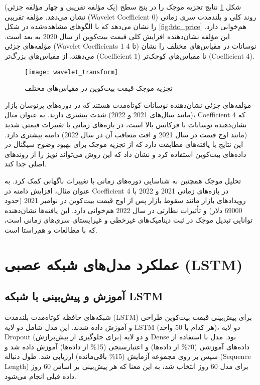 شکل \ref{fig:wavelet_transform} نتایج تجزیه موجک را در پنج سطح (یک مؤلفه تقریبی و چهار مؤلفه جزئی) نشان می‌دهد. مؤلفه تقریبی (Wavelet Coefficient 0) روند کلی و بلندمدت سری زمانی را نشان می‌دهد که با الگوهای مشاهده‌شده در شکل \ref{fig:btc_price} هم‌خوانی دارد. این مؤلفه نشان‌دهنده افزایش کلی قیمت بیت‌کوین از سال 2020 به بعد است. مؤلفه‌های جزئی (Wavelet Coefficients 1 تا 4) نوسانات در مقیاس‌های مختلف را نشان می‌دهند، از مقیاس‌های بزرگ‌تر (Coefficient 1) تا مقیاس‌های کوچک‌تر (Coefficient 4).

\begin{figure}[H]
	\centering
	\texttt{[image: wavelet\_transform]}
	\caption{تجزیه موجک قیمت بیت‌کوین در مقیاس‌های مختلف}
	\label{fig:wavelet_transform}
\end{figure}

مؤلفه‌های جزئی نشان‌دهنده نوسانات کوتاه‌مدت هستند که در دوره‌های پرنوسان بازار (مانند سال‌های 2021 و 2022) شدت بیشتری دارند. به عنوان مثال، Coefficient 4 که نشان‌دهنده نوسانات با فرکانس بالا است، در بازه‌های زمانی با تغییرات قیمتی شدید (مانند اوج قیمت در سال 2021 و افت متعاقب آن در سال 2022) دامنه بیشتری دارد. این نتایج با یافته‌های \cite{lahmiri2018chaos} مطابقت دارد که از تجزیه موجک برای بهبود وضوح سیگنال در داده‌های بیت‌کوین استفاده کرد و نشان داد که این روش می‌تواند نویز را از روندهای اصلی جدا کند.

تحلیل موجک همچنین به شناسایی دوره‌های زمانی با تغییرات ناگهانی کمک کرد. به عنوان مثال، افزایش دامنه در Coefficient 4 در بازه‌های زمانی 2021 و 2022 با رویدادهای بازار مانند سقوط بازار پس از اوج قیمت بیت‌کوین در نوامبر 2021 (حدود 69000 دلار) و تأثیرات نظارتی در سال 2022 هم‌خوانی دارد. این یافته‌ها نشان‌دهنده توانایی تبدیل موجک در ثبت دینامیک‌های غیرخطی و غیرایستای سری‌های زمانی است، که با مطالعات \cite{mallat1999wavelet} و \cite{percival2000wavelet} هم‌راستا است.

\section{عملکرد مدل‌های شبکه عصبی (LSTM)}
\label{sec:nn_results}

\subsection{آموزش و پیش‌بینی با شبکه LSTM}
شبکه‌های حافظه کوتاه‌مدت بلندمدت (LSTM) برای پیش‌بینی قیمت بیت‌کوین طراحی و آموزش داده شدند. این مدل شامل دو لایه LSTM (هر کدام با 50 واحد)، دو لایه Dropout (برای جلوگیری از بیش‌برازش) و دو لایه Dense بود. مدل با استفاده از داده‌های آموزشی (70\% از داده‌ها) و اعتبارسنجی (15\% از داده‌ها) آموزش داده شد و سپس بر روی مجموعه آزمایش (15\% باقی‌مانده) ارزیابی شد. طول دنباله (Sequence Length) برای مدل 60 روز انتخاب شد، به این معنا که هر پیش‌بینی بر اساس 60 روز داده قبلی انجام می‌شود.

